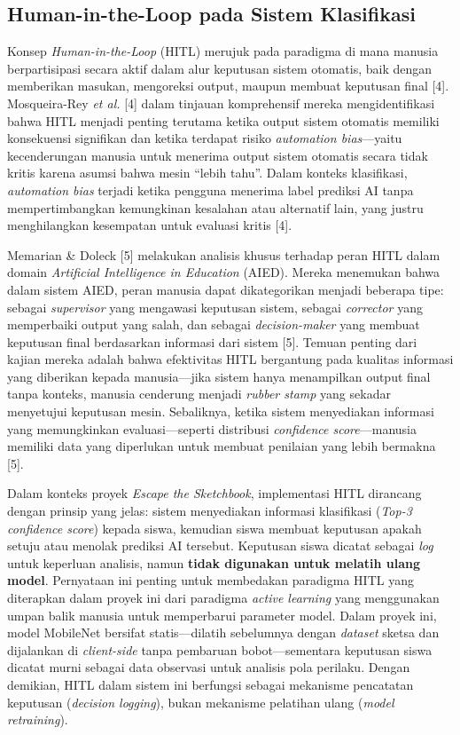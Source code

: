 \documentclass[12pt,oneside]{report}
\begin{document}
\subsection{Human-in-the-Loop pada Sistem Klasifikasi}
\label{subsec:hitl-klasifikasi}

Konsep \textit{Human-in-the-Loop} (HITL) merujuk pada paradigma di mana manusia berpartisipasi secara aktif dalam alur keputusan sistem otomatis, baik dengan memberikan masukan, mengoreksi output, maupun membuat keputusan final [4]. Mosqueira-Rey \textit{et al.} [4] dalam tinjauan komprehensif mereka mengidentifikasi bahwa HITL menjadi penting terutama ketika output sistem otomatis memiliki konsekuensi signifikan dan ketika terdapat risiko \textit{automation bias}—yaitu kecenderungan manusia untuk menerima output sistem otomatis secara tidak kritis karena asumsi bahwa mesin ``lebih tahu''. Dalam konteks klasifikasi, \textit{automation bias} terjadi ketika pengguna menerima label prediksi AI tanpa mempertimbangkan kemungkinan kesalahan atau alternatif lain, yang justru menghilangkan kesempatan untuk evaluasi kritis [4].

Memarian \& Doleck [5] melakukan analisis khusus terhadap peran HITL dalam domain \textit{Artificial Intelligence in Education} (AIED). Mereka menemukan bahwa dalam sistem AIED, peran manusia dapat dikategorikan menjadi beberapa tipe: sebagai \textit{supervisor} yang mengawasi keputusan sistem, sebagai \textit{corrector} yang memperbaiki output yang salah, dan sebagai \textit{decision-maker} yang membuat keputusan final berdasarkan informasi dari sistem [5]. Temuan penting dari kajian mereka adalah bahwa efektivitas HITL bergantung pada kualitas informasi yang diberikan kepada manusia—jika sistem hanya menampilkan output final tanpa konteks, manusia cenderung menjadi \textit{rubber stamp} yang sekadar menyetujui keputusan mesin. Sebaliknya, ketika sistem menyediakan informasi yang memungkinkan evaluasi—seperti distribusi \textit{confidence score}—manusia memiliki data yang diperlukan untuk membuat penilaian yang lebih bermakna [5].

Dalam konteks proyek \textit{Escape the Sketchbook}, implementasi HITL dirancang dengan prinsip yang jelas: sistem menyediakan informasi klasifikasi (\textit{Top-3 confidence score}) kepada siswa, kemudian siswa membuat keputusan apakah setuju atau menolak prediksi AI tersebut. Keputusan siswa dicatat sebagai \textit{log} untuk keperluan analisis, namun \textbf{tidak digunakan untuk melatih ulang model}. Pernyataan ini penting untuk membedakan paradigma HITL yang diterapkan dalam proyek ini dari paradigma \textit{active learning} yang menggunakan umpan balik manusia untuk memperbarui parameter model. Dalam proyek ini, model MobileNet bersifat statis—dilatih sebelumnya dengan \textit{dataset} sketsa dan dijalankan di \textit{client-side} tanpa pembaruan bobot—sementara keputusan siswa dicatat murni sebagai data observasi untuk analisis pola perilaku. Dengan demikian, HITL dalam sistem ini berfungsi sebagai mekanisme pencatatan keputusan (\textit{decision logging}), bukan mekanisme pelatihan ulang (\textit{model retraining}).
\end{document}
